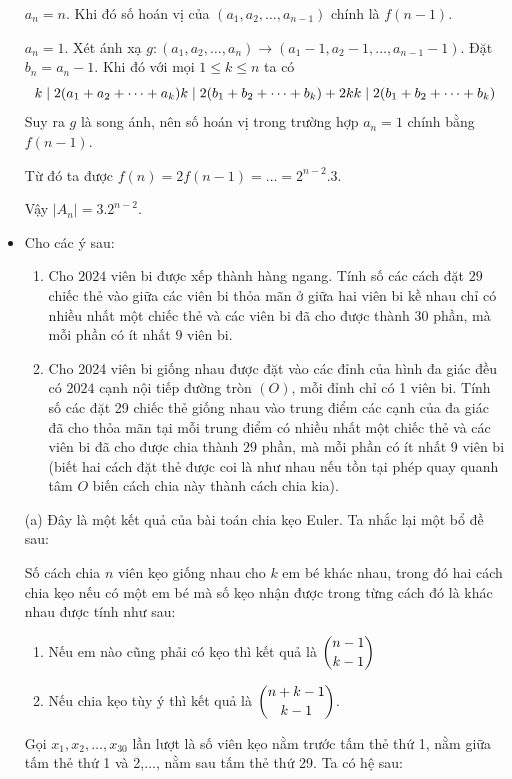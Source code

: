 \documentclass[11pt]{scrartcl}
\begin{document}
\begin{itemize}[label=, leftmargin=0em, itemsep=0.5em]
\begin{sol}
         $a_n = n$. Khi đó số hoán vị của $(a_1,a_2,\dots,a_{n -1})$ chính là $f(n - 1)$.

         $a_n = 1$. Xét ánh xạ $g: (a_1 ,a_2,\dots,a_n) \to(a_1 - 1, a_2 - 1,\dots,a_{n - 1} - 1)$. Đặt $b_n = a_n - 1$. Khi đó với mọi $1 \leq k \leq n$ ta có 
        \[
            k \mid 2(a_1 + a_2 + \dots + a_k) \lra k \mid 2(b_1 + b_2 + \dots + b_k) +2k  \ra k \mid 2(b_1 + b_2 + \dots + b_k)
        \]
        Suy ra $g$ là song ánh, nên số hoán vị trong trường hợp $a_n = 1$ chính bằng $f(n - 1)$. 

        Từ đó ta được $f(n) = 2f(n - 1) = \dots = 2^{n - 2}.3$.

        Vậy $|A_n| = 3.2^{n -2}$.
    \end{sol}
    \item \begin{bt}
        Cho các ý sau:
        \begin{enumerate}[label=(\alph*)]
            \item Cho $2024$ viên bi được xếp thành hàng ngang. Tính số các cách đặt $29$ chiếc thẻ vào giữa các viên bi thỏa mãn ở giữa hai viên bi kề nhau chỉ có nhiều nhất một chiếc thẻ và các viên bi đã cho được thành $30$ phần, mà mỗi phần có ít nhất $9$ viên bi.
            \item Cho 2024 viên bi giống nhau được đặt vào các đỉnh của hình đa giác đều có $2024$ cạnh nội tiếp đường tròn $(O)$, mỗi đỉnh chỉ có 1 viên bi. Tính số các đặt 29 chiếc thẻ giống nhau vào trung điểm các cạnh của đa giác đã cho thỏa mãn tại mỗi trung điểm có nhiều nhất một chiếc thẻ và các viên bi đã cho được chia thành $29$ phần, mà mỗi phần có ít nhất 9 viên bi (biết hai cách đặt thẻ được coi là như nhau nếu tồn tại phép quay quanh tâm $O$ biến cách chia này thành cách chia kia).
        \end{enumerate}
    \end{bt}
    \begin{sol}
        (a) Đây là một kết quả của bài toán chia kẹo Euler. Ta nhắc lại một bổ đề sau:
        \begin{lemma}
            Số cách chia $n$ viên kẹo giống nhau cho $k$ em bé khác nhau, trong đó hai cách chia kẹo nếu có một em bé mà số kẹo nhận được trong từng cách đó là khác nhau được tính như sau:

            \begin{enumerate}
                \item Nếu em nào cũng phải có kẹo thì kết quả là $\displaystyle\binom{n - 1}{k  -1}$
                \item Nếu chia kẹo tùy ý thì kết quả là $\displaystyle\binom{n + k - 1}{k - 1}$.
            \end{enumerate}
        \end{lemma}
        Gọi $x_1,x_2,\dots,x_{30}$ lần lượt là số viên kẹo nằm trước tấm thẻ thứ 1, nằm giữa tấm thẻ thứ 1 và 2,$\dots$, nằm sau tấm thẻ thứ 29. Ta có hệ sau:


\end{sol}
\end{itemize}
\end{document}
